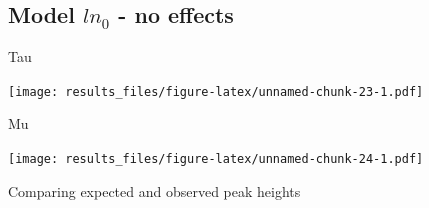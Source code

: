 \documentclass[]{article}
\newenvironment{Shaded}{\begin{snugshade}}{\end{snugshade}}
\newcommand{\DataTypeTok}[1]{\textcolor[rgb]{0.13,0.29,0.53}{#1}}
\newcommand{\DecValTok}[1]{\textcolor[rgb]{0.00,0.00,0.81}{#1}}
\newcommand{\KeywordTok}[1]{\textcolor[rgb]{0.13,0.29,0.53}{\textbf{#1}}}
\newcommand{\NormalTok}[1]{#1}
\newcommand{\OperatorTok}[1]{\textcolor[rgb]{0.81,0.36,0.00}{\textbf{#1}}}
\newcommand{\StringTok}[1]{\textcolor[rgb]{0.31,0.60,0.02}{#1}}
\begin{document}
\hypertarget{model-ln_0---no-effects}{%
\subsection{\texorpdfstring{Model \(ln_0\) - no
effects}{Model ln\_0 - no effects}}\label{model-ln_0---no-effects}}

Tau

\begin{Shaded}
\end{Shaded}

\texttt{[image: results\_files/figure-latex/unnamed-chunk-23-1.pdf]}

Mu

\begin{Shaded}
\end{Shaded}

\texttt{[image: results\_files/figure-latex/unnamed-chunk-24-1.pdf]}

Comparing expected and observed peak heights
\end{document}
